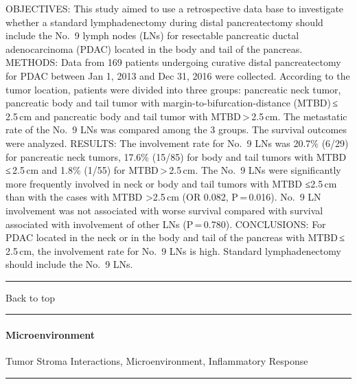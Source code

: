 \documentclass[]{article}
\let\oldparagraph\paragraph
\renewcommand{\paragraph}[1]{\oldparagraph{#1}\mbox{}}
\begin{document}
OBJECTIVES: This study aimed to use a retrospective data base to
investigate whether a standard lymphadenectomy during distal
pancreatectomy should include the No.~9 lymph nodes (LNs) for resectable
pancreatic ductal adenocarcinoma (PDAC) located in the body and tail of
the pancreas. METHODS: Data from 169 patients undergoing curative distal
pancreatectomy for PDAC between Jan 1, 2013 and Dec 31, 2016 were
collected. According to the tumor location, patients were divided into
three groups: pancreatic neck tumor, pancreatic body and tail tumor with
margin-to-bifurcation-distance (MTBD)\,≤\,2.5\,cm and pancreatic body
and tail tumor with MTBD\,\textgreater{}\,2.5\,cm. The metastatic rate
of the No.~9 LNs was compared among the 3 groups. The survival outcomes
were analyzed. RESULTS: The involvement rate for No.~9 LNs was 20.7\%
(6/29) for pancreatic neck tumors, 17.6\% (15/85) for body and tail
tumors with MTBD\,≤\,2.5\,cm and 1.8\% (1/55) for
MTBD\,\textgreater{}\,2.5\,cm. The No.~9 LNs were significantly more
frequently involved in neck or body and tail tumors with MTBD ≤2.5\,cm
than with the cases with MTBD \textgreater{}2.5\,cm (OR 0.082,
P\,=\,0.016). No.~9 LN involvement was not associated with worse
survival compared with survival associated with involvement of other LNs
(P\,=\,0.780). CONCLUSIONS: For PDAC located in the neck or in the body
and tail of the pancreas with MTBD\,≤\,2.5\,cm, the involvement rate for
No.~9 LNs is high. Standard lymphadenectomy should include the No.~9
LNs.

{}

{}

\begin{center}\rule{0.5\linewidth}{\linethickness}\end{center}

Back to top

\begin{center}\rule{0.5\linewidth}{\linethickness}\end{center}

\pagebreak

\hypertarget{microenvironment}{%
\paragraph{Microenvironment}\label{microenvironment}}

Tumor Stroma Interactions, Microenvironment, Inflammatory Response

\begin{center}\rule{0.5\linewidth}{\linethickness}\end{center}
\end{document}

